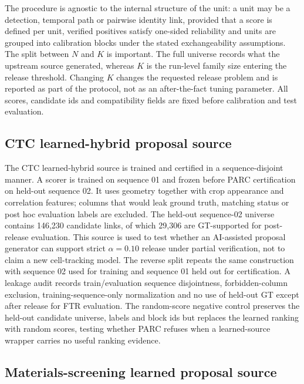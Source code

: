 \documentclass[10pt,twocolumn]{article}
\begin{document}
The procedure is agnostic to the internal structure of the unit: a unit may be a detection, temporal path or pairwise identity link, provided that a score is defined per unit, verified positives satisfy one-sided reliability and units are grouped into calibration blocks under the stated exchangeability assumptions.
The split between \(N\) and \(K\) is important.
The full universe records what the upstream source generated, whereas \(K\) is the run-level family size entering the release threshold.
Changing \(K\) changes the requested release problem and is reported as part of the protocol, not as an after-the-fact tuning parameter.
All scores, candidate ids and compatibility fields are fixed before calibration and test evaluation.

\subsection{CTC learned-hybrid proposal source}

The CTC learned-hybrid source is trained and certified in a sequence-disjoint manner.
A scorer is trained on sequence 01 and frozen before PARC certification on held-out sequence 02.
It uses geometry together with crop appearance and correlation features; columns that would leak ground truth, matching status or post hoc evaluation labels are excluded.
The held-out sequence-02 universe contains 146,230 candidate links, of which 29,306 are GT-supported for post-release evaluation.
This source is used to test whether an AI-assisted proposal generator can support strict \(\alpha=0.10\) release under partial verification, not to claim a new cell-tracking model.
The reverse split repeats the same construction with sequence 02 used for training and sequence 01 held out for certification.
A leakage audit records train/evaluation sequence disjointness, forbidden-column exclusion, training-sequence-only normalization and no use of held-out GT except after release for FTR evaluation.
The random-score negative control preserves the held-out candidate universe, labels and block ids but replaces the learned ranking with random scores, testing whether PARC refuses when a learned-source wrapper carries no useful ranking evidence.

\subsection{Materials-screening learned proposal source}
\end{document}
